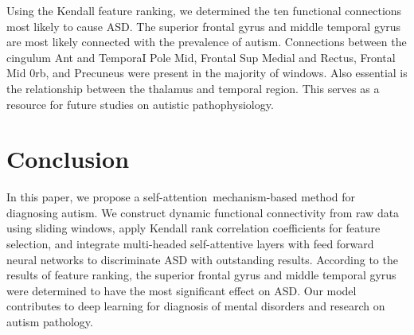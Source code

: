 \documentclass[a4paper]{cas-dc}
\begin{document}
Using the Kendall feature ranking, we determined the ten functional connections most likely to cause ASD. The superior frontal gyrus and middle temporal gyrus are most likely connected with the prevalence of autism. Connections between the cingulum Ant and TemporaI Pole Mid, Frontal Sup Medial and Rectus, Frontal Mid 0rb, and Precuneus were present in the majority of windows. Also essential is the relationship between the thalamus and temporal region. This serves as a resource for future studies on autistic pathophysiology.
\section{Conclusion}
In this paper, we propose a self-attention mechanism-based method for diagnosing autism. We construct dynamic functional connectivity from raw data using sliding windows, apply Kendall rank correlation coefficients for feature selection, and integrate multi-headed self-attentive layers with feed forward neural networks to discriminate ASD with outstanding results. According to the results of feature ranking, the superior frontal gyrus and middle temporal gyrus were determined to have the most significant effect on ASD. Our model contributes to deep learning for diagnosis of mental disorders and research on autism pathology.

%





\end{document}
